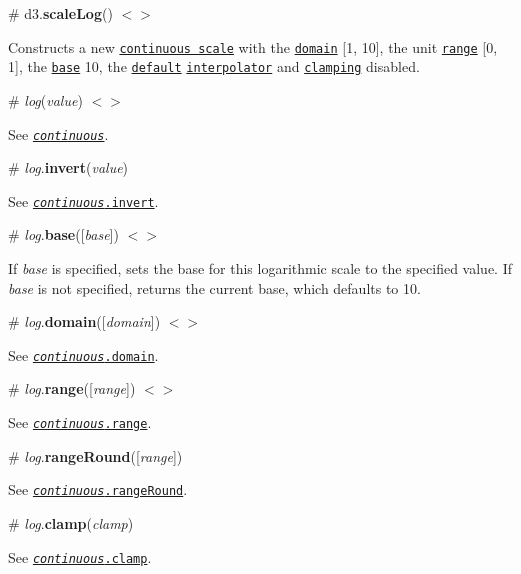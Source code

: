 \label{_scaleLog}%
\# d3.{\bfseries scale\+Log}() \href{https://github.com/d3/d3-scale/blob/master/src/log.js}{\tt $<$$>$}

Constructs a new \href{#continuous-scales}{\tt continuous scale} with the \href{#log_domain}{\tt domain} \mbox{[}1, 10\mbox{]}, the unit \href{#log_range}{\tt range} \mbox{[}0, 1\mbox{]}, the \href{#log_base}{\tt base} 10, the \href{https://github.com/d3/d3-interpolate#interpolate}{\tt default} \href{#log_interpolate}{\tt interpolator} and \href{#log_clamp}{\tt clamping} disabled.

\label{_log}%
\# {\itshape log}({\itshape value}) \href{https://github.com/d3/d3-scale/blob/master/src/log.js#L42}{\tt $<$$>$}

See \href{#_continuous}{\tt {\itshape continuous}}.

\label{_log_invert}%
\# {\itshape log}.{\bfseries invert}({\itshape value})

See \href{#continuous_invert}{\tt {\itshape continuous}.invert}.

\label{_log_base}%
\# {\itshape log}.{\bfseries base}(\mbox{[}{\itshape base}\mbox{]}) \href{https://github.com/d3/d3-scale/blob/master/src/log.js#L55}{\tt $<$$>$}

If {\itshape base} is specified, sets the base for this logarithmic scale to the specified value. If {\itshape base} is not specified, returns the current base, which defaults to 10.

\label{_log_domain}%
\# {\itshape log}.{\bfseries domain}(\mbox{[}{\itshape domain}\mbox{]}) \href{https://github.com/d3/d3-scale/blob/master/src/log.js#L59}{\tt $<$$>$}

See \href{#continuous_domain}{\tt {\itshape continuous}.domain}.

\label{_log_range}%
\# {\itshape log}.{\bfseries range}(\mbox{[}{\itshape range}\mbox{]}) \href{https://github.com/d3/d3-scale/blob/master/src/continuous.js#L96}{\tt $<$$>$}

See \href{#continuous_range}{\tt {\itshape continuous}.range}.

\label{_log_rangeRound}%
\# {\itshape log}.{\bfseries range\+Round}(\mbox{[}{\itshape range}\mbox{]})

See \href{#continuous_rangeRound}{\tt {\itshape continuous}.range\+Round}.

\label{_log_clamp}%
\# {\itshape log}.{\bfseries clamp}({\itshape clamp})

See \href{#continuous_clamp}{\tt {\itshape continuous}.clamp}.

